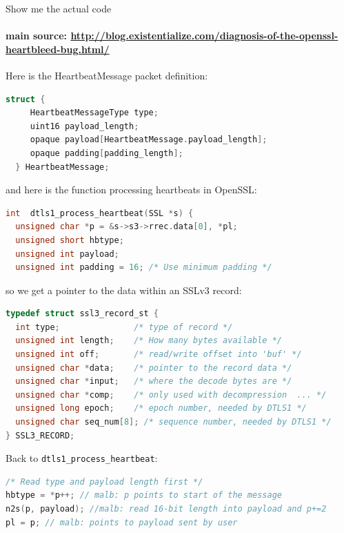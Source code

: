 \documentclass[10pt]{beamer}
\begin{document}
\begin{frame}{Show me the actual code}
\framesubtitle{{\scriptsize \textbf{main source:} \url{http://blog.existentialize.com/diagnosis-of-the-openssl-heartbleed-bug.html/}}}

Here is the HeartbeatMessage packet definition:

\begin{lstlisting}[language=c,morekeywords={opaque,uint16}]
struct {
     HeartbeatMessageType type;
     uint16 payload_length;
     opaque payload[HeartbeatMessage.payload_length];
     opaque padding[padding_length];
  } HeartbeatMessage;
\end{lstlisting}

\framebreak

and here is the function processing heartbeats in OpenSSL:

\begin{lstlisting}[language=c,morekeywords={}]
int  dtls1_process_heartbeat(SSL *s) {          
  unsigned char *p = &s->s3->rrec.data[0], *pl;
  unsigned short hbtype;
  unsigned int payload;
  unsigned int padding = 16; /* Use minimum padding */
\end{lstlisting}

so we get a pointer to the data within an SSLv3 record:

\begin{lstlisting}[language=c,morekeywords={}]
typedef struct ssl3_record_st {
  int type;               /* type of record */
  unsigned int length;    /* How many bytes available */
  unsigned int off;       /* read/write offset into 'buf' */
  unsigned char *data;    /* pointer to the record data */
  unsigned char *input;   /* where the decode bytes are */
  unsigned char *comp;    /* only used with decompression  ... */
  unsigned long epoch;    /* epoch number, needed by DTLS1 */
  unsigned char seq_num[8]; /* sequence number, needed by DTLS1 */
} SSL3_RECORD;
\end{lstlisting}

\framebreak

Back to \texttt{dtls1\_process\_heartbeat}:

\begin{lstlisting}[language=c,morekeywords={memcpy,n2s,s2n}]
/* Read type and payload length first */
hbtype = *p++; // malb: p points to start of the message
n2s(p, payload); //malb: read 16-bit length into payload and p+=2
pl = p; // malb: points to payload sent by user
\end{lstlisting}


\end{frame}
\end{document}
